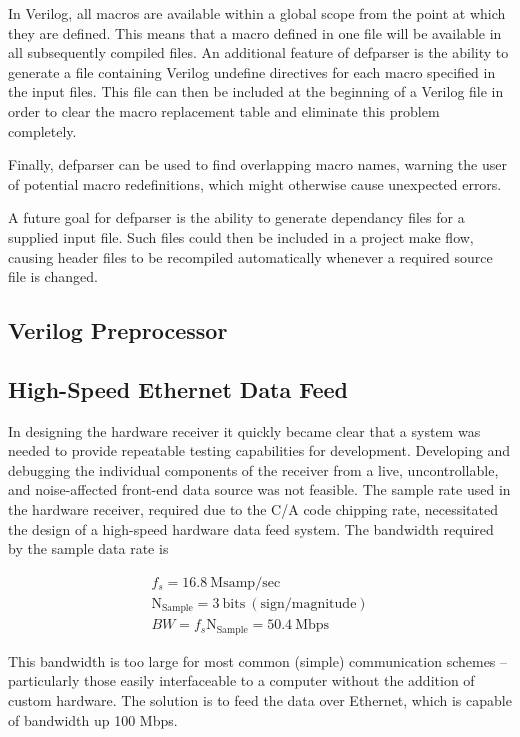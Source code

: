 \documentclass[12pt]{article}
\begin{document}
In Verilog, all macros are available within a global scope from the point at which they are defined. This means that a macro defined in one file will be available in all subsequently compiled files. An additional feature of defparser is the ability to generate a file containing Verilog undefine directives for each macro specified in the input files. This file can then be included at the beginning of a Verilog file in order to clear the macro replacement table and eliminate this problem completely.

Finally, defparser can be used to find overlapping macro names, warning the user of potential macro redefinitions, which might otherwise cause unexpected errors.

A future goal for defparser is the ability to generate dependancy files for a supplied input file. Such files could then be included in a project make flow, causing header files to be recompiled automatically whenever a required source file is changed.

\subsection{Verilog Preprocessor}

\subsection{High-Speed Ethernet Data Feed}
In designing the hardware receiver it quickly became clear that a system was needed to provide repeatable testing capabilities for development. Developing and debugging the individual components of the receiver from a live, uncontrollable, and noise-affected front-end data source was not feasible. The sample rate used in the hardware receiver, required due to the C/A code chipping rate, necessitated the design of a high-speed hardware data feed system. The bandwidth required by the sample data rate is

\begin{gather*}
f_s = 16.8\ \mathrm{Msamp/sec} \\
\mathrm{N_{Sample}} = 3\ \mathrm{bits\ (sign/magnitude)} \\
BW = f_s \mathrm{N_{Sample}} = 50.4\ \mathrm{Mbps}
\end{gather*}

This bandwidth is too large for most common (simple) communication schemes -- particularly those easily interfaceable to a computer without the addition of custom hardware. The solution is to feed the data over Ethernet, which is capable of bandwidth up 100 Mbps.
\end{document}
